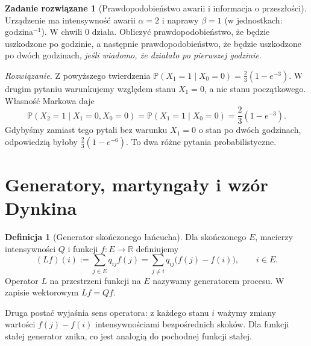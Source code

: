\documentclass[11pt,a4paper,oneside]{report}
\numberwithin{equation}{chapter}
\theoremstyle{plain}
\theoremstyle{definition}
\newtheorem{definicja}{Definicja}[chapter]
\newtheorem{zadanie}{Zadanie rozwiązane}[chapter]
\theoremstyle{remark}
\newcommand{\R}{\mathbb{R}}
\newcommand{\Prob}{\mathbb{P}}
\begin{document}
\begin{zadanie}[Prawdopodobieństwo awarii i informacja o przeszłości]
Urządzenie ma intensywność awarii $\alpha=2$ i naprawy
$\beta=1$ (w jednostkach: godzina$^{-1}$).
W chwili $0$ działa. Obliczyć prawdopodobieństwo,
że będzie uszkodzone po godzinie, a następnie
prawdopodobieństwo, że będzie uszkodzone po dwóch godzinach,
\emph{jeśli wiadomo, że działało po pierwszej godzinie}.

\emph{Rozwiązanie.} Z powyższego twierdzenia
$\Prob(X_1=1\mid X_0=0)=\tfrac23(1-e^{-3})$.
W drugim pytaniu warunkujemy względem stanu $X_1=0$,
a nie stanu początkowego. Własność Markowa daje
\[
\Prob(X_2=1\mid X_1=0,X_0=0)
=\Prob(X_1=1\mid X_0=0)=\frac23(1-e^{-3}).
\]
Gdybyśmy zamiast tego pytali bez warunku $X_1=0$
o stan po dwóch godzinach, odpowiedzią byłoby
$\tfrac23(1-e^{-6})$. To dwa różne pytania probabilistyczne.
\end{zadanie}

\section{Generatory, martyngały i wzór Dynkina}
\begin{definicja}[Generator skończonego łańcucha]
Dla skończonego $E$, macierzy intensywności $Q$ i funkcji
$f:E\to\R$ definiujemy
\[
(Lf)(i):=\sum_{j\in E}q_{ij}f(j)
=\sum_{j\ne i}q_{ij}\bigl(f(j)-f(i)\bigr),\qquad i\in E.
\]
Operator $L$ na przestrzeni funkcji na $E$ nazywamy
generatorem procesu. W zapisie wektorowym $Lf=Qf$.
\end{definicja}

Druga postać wyjaśnia sens operatora: z każdego stanu $i$
ważymy zmiany wartości $f(j)-f(i)$ intensywnościami
bezpośrednich skoków. Dla funkcji stałej generator znika,
co jest analogią do pochodnej funkcji stałej.
\end{document}

